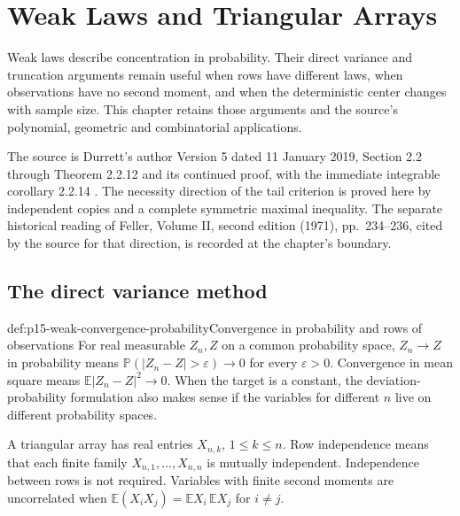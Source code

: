 \chapter{Weak Laws and Triangular Arrays}
\label{sec:p15-weak-laws-and-triangular-arrays}

Weak laws describe concentration in probability. Their direct variance
and truncation arguments remain useful when rows have different laws,
when observations have no second moment, and when the deterministic
center changes with sample size. This chapter retains those arguments
and the source's polynomial, geometric and combinatorial applications.

The source is Durrett's author Version 5 dated 11 January 2019,
Section 2.2 through Theorem 2.2.12 and its continued proof, with
the immediate integrable corollary 2.2.14
\cite[pp.~56--64]{DurrettPTEAuthor2019}.
The necessity direction of the tail criterion is proved here by
independent copies and a complete symmetric maximal inequality.
The separate historical reading of Feller, Volume II, second edition
(1971), pp.~234--236, cited by the source for that direction, is
recorded at the chapter's boundary.

\section{The direct variance method}
\label{sec:p15-direct-weak-variance}

\begin{hbdefinition}{def:p15-weak-convergence-probability}{Convergence in probability and rows of observations}
For real measurable \(Z_n,Z\) on a common probability space,
\(Z_n\to Z\) in probability means
\(\mathbb P(|Z_n-Z|>\varepsilon)\to0\) for every \(\varepsilon>0\).
Convergence in mean square means
\(\mathbb E|Z_n-Z|^2\to0\).
When the target is a constant, the deviation-probability formulation
also makes sense if the variables for different \(n\) live on different
probability spaces.

A triangular array has real entries \(X_{n,k}\), \(1\leq k\leq n\).
Row independence means that each finite family
\(X_{n,1},\ldots,X_{n,n}\) is mutually independent. Independence
between rows is not required. Variables with finite second moments
are uncorrelated when
\(\mathbb E(X_iX_j)=\mathbb EX_i\,\mathbb EX_j\) for \(i\ne j\).
\end{hbdefinition}

